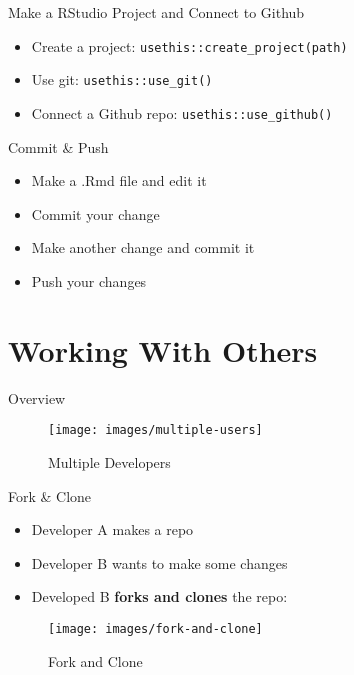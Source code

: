 \documentclass[
  ignorenonframetext,
]{beamer}
\providecommand{\tightlist}{%
  \setlength{\itemsep}{0pt}\setlength{\parskip}{0pt}}
\begin{document}
\begin{frame}[fragile]{Make a RStudio Project and Connect to Github}
\protect\hypertarget{make-a-rstudio-project-and-connect-to-github}{}
\begin{itemize}
\tightlist
\item
  Create a project: \texttt{usethis::create\_project(path)}
\item
  Use git: \texttt{usethis::use\_git()}
\item
  Connect a Github repo: \texttt{usethis::use\_github()}
\end{itemize}
\end{frame}

\begin{frame}{Commit \& Push}
\protect\hypertarget{commit-push}{}
\begin{itemize}
\tightlist
\item
  Make a .Rmd file and edit it
\item
  Commit your change
\item
  Make another change and commit it
\item
  Push your changes
\end{itemize}
\end{frame}

\hypertarget{working-with-others}{%
\section{Working With Others}\label{working-with-others}}

\begin{frame}{Overview}
\protect\hypertarget{overview}{}
\begin{figure}

{\centering \texttt{[image: images/multiple-users]} 

}

\caption{Multiple Developers}\label{fig:unnamed-chunk-7}
\end{figure}
\end{frame}

\begin{frame}{Fork \& Clone}
\protect\hypertarget{fork-clone}{}
\begin{itemize}
\tightlist
\item
  Developer A makes a repo
\item
  Developer B wants to make some changes
\item
  Developed B \textbf{forks and clones} the repo:
\end{itemize}

\begin{figure}

{\centering \texttt{[image: images/fork-and-clone]} 

}

\caption{Fork and Clone}\label{fig:unnamed-chunk-8}
\end{figure}
\end{frame}
\end{document}
